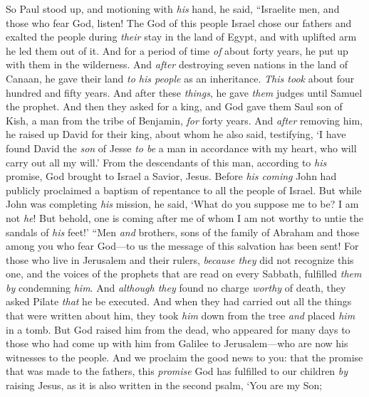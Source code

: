 \begin{biblechapter}
\verse So Paul stood up, and motioning with \textit{his} hand, he said, “Israelite men, and those who fear God, listen!
\verse The God of this people Israel chose our fathers and exalted the people during \textit{their} stay in the land of Egypt, and with uplifted arm he led them out of it.
\verse And for a period of time \textit{of} about forty years, he put up with them in the wilderness.
\verse And \textit{after} destroying seven nations in the land of Canaan, he gave their land \textit{to his people} as an inheritance.
\verse \textit{This took} about four hundred and fifty years. And after these \textit{things}, he gave \textit{them} judges until Samuel the prophet.
\verse And then they asked for a king, and God gave them Saul son of Kish, a man from the tribe of Benjamin, \textit{for} forty years.
\verse And \textit{after} removing him, he raised up David for their king, about whom he also said, testifying, ‘I have found David the \textit{son} of Jesse \textit{to be} a man in accordance with my heart, who will carry out all my will.’
\verse From the descendants of this man, according to \textit{his} promise, God brought to Israel a Savior, Jesus.
\verse Before \textit{his coming} John had publicly proclaimed a baptism of repentance to all the people of Israel.
\verse But while John was completing \textit{his} mission, he said, ‘What do you suppose me to be? I am not \textit{he}! But behold, one is coming after me of whom I am not worthy to untie the sandals of \textit{his} feet!’
\verse “Men \textit{and} brothers, sons of the family of Abraham and those among you who fear God—to us the message of this salvation has been sent!
\verse For those who live in Jerusalem and their rulers, \textit{because they} did not recognize this one, and the voices of the prophets that are read on every Sabbath, fulfilled \textit{them} \textit{by} condemning \textit{him}.
\verse And \textit{although they} found no charge \textit{worthy} of death, they asked Pilate \textit{that} he be executed.
\verse And when they had carried out all the things that were written about him, they took \textit{him} down from the tree \textit{and} placed \textit{him} in a tomb.
\verse But God raised him from the dead,
\verse who appeared for many days to those who had come up with him from Galilee to Jerusalem—who are now his witnesses to the people.
\verse And we proclaim the good news to you: that the promise that was made to the fathers,
\verse this \textit{promise} God has fulfilled to our children \textit{by} raising Jesus, as it is also written in the second psalm, ‘You are my Son; 

\end{biblechapter}
